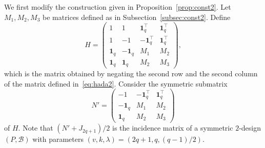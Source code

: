 \documentclass[ALCO,ThmDefs,Unicode]{cedram}
\newcommand*\tra{\top}
\newcommand*{\un}{\mathbf{1}}
\begin{document}
We first modify the construction given in Proposition~\ref{prop:const2}. Let $M_1,M_2,M_3$ be matrices defined as in Subsection~\ref{subsec:const2}. Define
\begin{equation}\label{eq:hada3}
H=
\begin{pmatrix}
1 &1 & \un_q^\tra& \un_q^\tra \\
1 & -1 & -\un_q^\tra&\un_q^\tra \\
\un_q & -\un_q &M_1 & M_2 \\
\un_q & \un_q&M_2 & M_3
\end{pmatrix},
\end{equation}
which is the matrix obtained by negating the second row and the second column of the matrix defined in~\eqref{eq:hada2}. Consider the symmetric submatrix
\begin{equation}\label{eq:hada4}
N'=
\begin{pmatrix}
-1 & -\un_q^\tra & \un_q^\tra \\
-\un_q & M_1& M_2 \\
\un_q& M_2 & M_3
\end{pmatrix}
\end{equation}
of $H$. Note that $(N'+J_{2q+1})/2$ is the incidence matrix of a symmetric $2$-design $(P,{\mathcal B})$ with parameters $(v,k,\lambda)=(2q+1,q,(q-1)/2)$.
\end{document}
